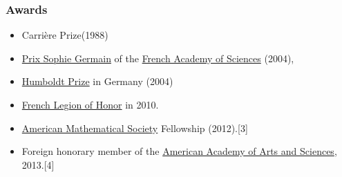 \documentclass{article}
\begin{document}
\subsubsection{Awards}
\begin{itemize}
	\item Carrière Prize(1988)
	\item \href{https://en.wikipedia.org/wiki/Sophie_Germain#Sophie_Germain_Prize}{Prix Sophie Germain} of the \href{https://en.wikipedia.org/wiki/French_Academy_of_Sciences}{French Academy of Sciences} (2004),
	\item \href{https://en.wikipedia.org/wiki/Humboldt_Prize}{Humboldt Prize} in Germany (2004)
	\item \href{https://en.wikipedia.org/wiki/French_Legion_of_Honor}{French Legion of Honor} in 2010.
	\item \href{https://en.wikipedia.org/wiki/American_Mathematical_Society}{American Mathematical Society} Fellowship (2012).[3]
	\item Foreign honorary member of the \href{https://en.wikipedia.org/wiki/American_Academy_of_Arts_and_Sciences}{American Academy of Arts and Sciences}, 2013.[4]
\end{itemize}
\end{document}
